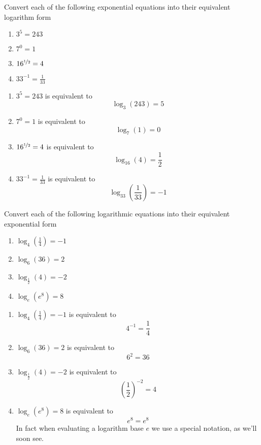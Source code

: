 \begin{pccexample} 
	Convert each of the following exponential equations into their equivalent logarithm form
	\begin{multicols}{4}
		\begin{enumerate}
			\item $3^{5}=243$
			\item $7^{0}=1$
			\item $16^{\nicefrac{1}{2}}=4$
			\item $33^{-1}=\frac{1}{33}$
		\end{enumerate}
	\end{multicols}
	\begin{pccsolution}
		\begin{enumerate}
			\item $3^{5}=243$ is equivalent to 
			\[
				\log_3(243)=5
			\]
			\item $7^{0}=1$ is equivalent to 
			\[
				\log_7(1)=0
			\]
			\item $16^{\nicefrac{1}{2}}=4$ is equivalent to 
			\[
				\log_{16}(4)=\frac{1}{2}
			\]
			\item $33^{-1}=\frac{1}{33}$ is equivalent to
			\[
				\log_{33}\left( \frac{1}{33} \right)=-1
			\]
		\end{enumerate}
	\end{pccsolution}
\end{pccexample}
\begin{pccexample}
	Convert each of the following logarithmic equations into their equivalent exponential form
	\begin{multicols}{4}
		\begin{enumerate}
			\item $\log_4\left( \frac{1}{4} \right)=-1$
			\item $\log_{6}(36)=2$
			\item $\log_{\frac{1}{2}}(4)=-2$
			\item $\log_{e}(e^8)=8$
		\end{enumerate}
	\end{multicols}
	\begin{pccsolution}
		\begin{enumerate}
			\item $\log_4\left( \frac{1}{4} \right)=-1$ is equivalent to
			\[
				4^{-1}=\frac{1}{4}
			\]
			\item $\log_{6}(36)=2$ is equivalent to
			\[
				6^2=36
			\]
			\item $\log_{\frac{1}{2}}(4)=-2$ is equivalent to 
			\[
				\left(\frac{1}{2}\right)^{-2}=4
			\]
			\item $\log_{e}(e^8)=8$ is equivalent to
			\[
				e^8=e^8
			\]
			In fact when evaluating a logarithm base $e$ we use a special notation, as we'll soon 
			see.
		\end{enumerate}
		\mbox{}
	\end{pccsolution}
\end{pccexample}

